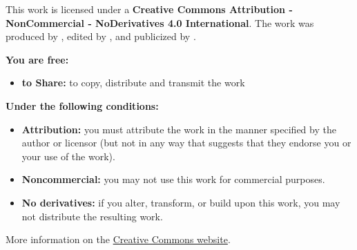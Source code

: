         This work is licensed under a \textbf{Creative Commons Attribution - NonCommercial - NoDerivatives 4.0 International}.
        The work was produced by \DDauthors\ifx\DDeditors\empty\else, edited by \DDeditors\fi{}, and publicized by \DDorganization.

        \textbf{You are free:}
        \begin{itemize}[topsep=0pt,itemsep=0pt,parsep=0pt,partopsep=0pt]
            \item \textbf{to Share:} to copy, distribute and transmit the work
        \end{itemize}

        \textbf{Under the following conditions:}
        \begin{itemize}[topsep=0pt,itemsep=0pt,parsep=0pt,partopsep=0pt]
            \item \textbf{Attribution:} you must attribute the work in the manner specified by the author or licensor (but not in any way that suggests that they endorse you or your use of the work).
            \item \textbf{Noncommercial:} you may not use this work for commercial purposes.
            \item \textbf{No derivatives:} if you alter, transform, or build upon this work, you may not distribute the resulting work.
        \end{itemize}

        More information on the \href{https://creativecommons.org/licenses/by-nc-nd/4.0/}{Creative Commons website}.
    \fi
\endgroup  %
\clearpage
